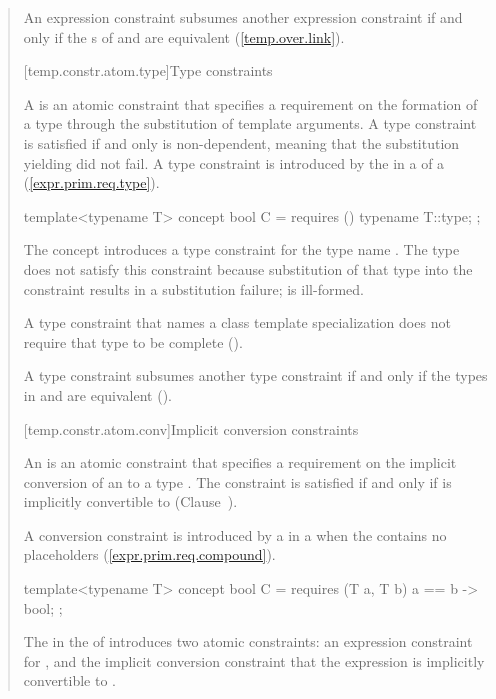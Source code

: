 \begin{quote}
\pnum
An expression constraint  subsumes another expression constraint 
 if and only if the s of 
and  are equivalent (\ref{temp.over.link}). 


[temp.constr.atom.type]{Type constraints}

\pnum
A  is an atomic constraint that specifies a requirement 
on the formation of a type  through the substitution of template 
arguments.
% 
A type constraint is satisfied if and only  is non-dependent, meaning 
that the substitution yielding  did not fail.
% 
\enternote
A type constraint is introduced by the  in a
 of a 
(\ref{expr.prim.req.type}).
\exitnote
% 
\enterexample
\begin{codeblock}
template<typename T> concept bool C = requires () { typename T::type; };
\end{codeblock}
The concept  introduces a type constraint for the 
type name .
% 
The type  does not satisfy this constraint
because substitution of that type into the constraint results in a
substitution failure;  is ill-formed.
\exitexample

\pnum
A type constraint that names a class template specialization 
does not require that type to be complete 
().

\pnum
A type constraint  subsumes another type
constraint  if and only if the types in 
and  are equivalent 
().


[temp.constr.atom.conv]{Implicit conversion constraints}

\pnum
An  is an atomic constraint that 
specifies a requirement on the implicit conversion of an 
 to a type . 
% 
The constraint is satisfied if and only if  is implicitly convertible 
to  (Clause~).

\enternote
A conversion constraint is introduced by a  
in a  when the 
 contains no placeholders 
(\ref{expr.prim.req.compound}).
\exitnote

\enterexample
\begin{codeblock}
template<typename T> concept bool C = 
  requires (T a, T b) {
    { a == b } -> bool;
  };
\end{codeblock}
The  in the
 of  introduces two atomic 
constraints: an expression constraint for , and the implicit 
conversion constraint that the expression  is implicitly 
convertible to .
\exitexample


\end{quote}

